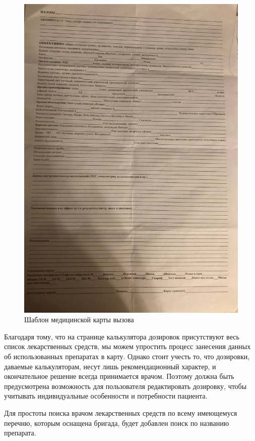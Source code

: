 \begin{figure}
  \includegraphics[scale=0.35]{inc/шаблон карты.jpg}
  \caption{Шаблон медицинской карты вызова}
  \label{fig:fig01}
\end{figure}


Благодаря тому, что на странице калькулятора дозировок присутствуют весь список лекарственных средств, мы можем упростить процесс занесения данных об использованных препаратах в карту. Однако стоит учесть то, что дозировки, даваемые калькуляторам, несут лишь рекомендационный характер, и окончательное решение всегда принимается врачом. Поэтому должна быть предусмотрена возможность для пользователя редактировать дозировку, чтобы учитывать индивидуальные особенности и потребности пациента.

Для простоты поиска врачом лекарственных средств по всему имеющемуся перечню, которым оснащена бригада, будет добавлен поиск по названию препарата.

